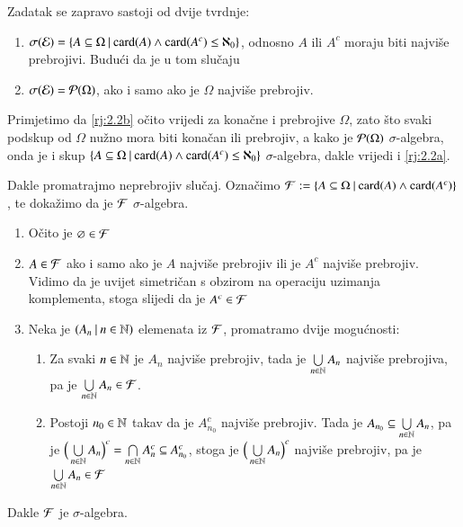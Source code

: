 \begin{rj}
    Zadatak se zapravo sastoji od dvije tvrdnje:
    \begin{enumerate}[label=(\arabic*)]
        \item \label{rj:2.2a}
        $\sigma({\mathcal{E}}) = \{{A \subseteq \Omega} \: | \: {\textnormal{card}({A}) \land \textnormal{card}({A^c}) \leq \aleph_0}\}$, odnosno $A$ ili $A^c$ moraju biti najvi\v se prebrojivi. Budu\' ci da je u tom slu\v caju
        \item   \label{rj:2.2b}
        $\sigma({\mathcal{E}}) = \mathcal{P}({\Omega})$, ako i samo ako je $\Omega$ najvi\v se prebrojiv.
    \end{enumerate}
    Primjetimo da \ref{rj:2.2b} o\v cito vrijedi za kona\v cne i prebrojive $\Omega$, zato \v sto svaki podskup od $\Omega$ nu\v zno mora biti kona\v can ili prebrojiv, a kako je $\mathcal{P}({\Omega})$ $\sigma$-algebra, onda je i skup $\{{A \subseteq \Omega} \: | \: {\textnormal{card}({A}) \land \textnormal{card}({A^c}) \leq \aleph_0}\}$ $\sigma$-algebra, dakle vrijedi i \ref{rj:2.2a}.

    Dakle promatrajmo neprebrojiv slu\v caj.
    Ozna\v cimo $\mathcal{F} := \{{A \subseteq \Omega} \: | \: {\textnormal{card}({A}) \land \textnormal{card}({A^c})}\}$, te doka\v zimo da je $\mathcal{F}$ $\sigma$-algebra.
    \begin{enumerate}[label=(\roman*)]
        \item O\v cito je $\varnothing \in \mathcal{F}$
        \item $A \in \mathcal{F}$ ako i samo ako je $A$ najvi\v se prebrojiv ili je $A^c$ najvi\v se prebrojiv.
        Vidimo da je uvijet simetri\v can s obzirom na operaciju uzimanja komplementa, stoga slijedi da je $A^c \in \mathcal{F}$
        \item Neka je $({A_n} \: | \: {n \in \mathbb{N}})$ elemenata iz $\mathcal{F}$, promatramo dvije mogu\' cnosti:
        \begin{enumerate}[label=\arabic*$\degree$)]
            \item Za svaki $n \in \mathbb{N}$ je $A_n$ najvi\v se prebrojiv, tada je $\bigcup\limits_{n \in \mathbb{N}}^{} A_n$ najvi\v se prebrojiva, pa je $\bigcup\limits_{n \in \mathbb{N}}^{} A_n \in \mathcal{F}$.
            \item Postoji $n_0 \in \mathbb{N}$ takav da je $A_{n_0}^c$ najvi\v se prebrojiv.
            Tada je $A_{n_0} \subseteq \bigcup\limits_{n \in \mathbb{N}}^{} A_n$, pa je $\Big( \bigcup\limits_{n \in \mathbb{N}}^{} A_n \Big)^c = \bigcap\limits_{n \in \mathbb{N}}^{} A_n^c \subseteq A_{n_0}^c$, stoga je $\Big( \bigcup\limits_{n \in \mathbb{N}}^{} A_n \Big)^c$ najvi\v se prebrojiv, pa je $\bigcup\limits_{n \in \mathbb{N}}^{} A_n \in \mathcal{F}$
        \end{enumerate}
    \end{enumerate}
    Dakle $\mathcal{F}$ je $\sigma$-algebra.


\end{rj}
